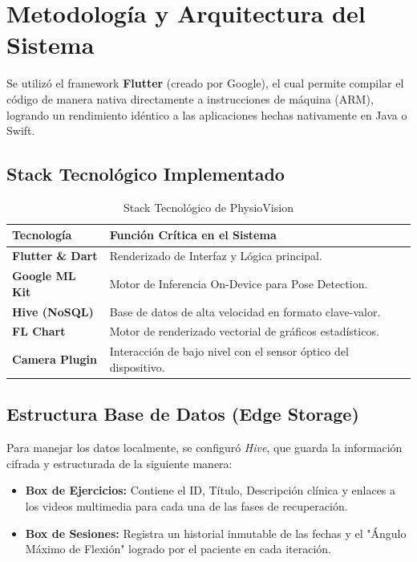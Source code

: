 \documentclass[12pt, a4paper]{article}
\begin{document}
\section{Metodología y Arquitectura del Sistema}
Se utilizó el framework \textbf{Flutter} (creado por Google), el cual permite compilar el código de manera nativa directamente a instrucciones de máquina (ARM), logrando un rendimiento idéntico a las aplicaciones hechas nativamente en Java o Swift.

\subsection{Stack Tecnológico Implementado}
\begin{table}[h]
    \centering
    \begin{tabular}{|l|l|}
    \hline
    \textbf{Tecnología} & \textbf{Función Crítica en el Sistema} \\ \hline
    \textbf{Flutter \& Dart} & Renderizado de Interfaz y Lógica principal. \\ \hline
    \textbf{Google ML Kit} & Motor de Inferencia On-Device para Pose Detection. \\ \hline
    \textbf{Hive (NoSQL)} & Base de datos de alta velocidad en formato clave-valor. \\ \hline
    \textbf{FL Chart} & Motor de renderizado vectorial de gráficos estadísticos. \\ \hline
    \textbf{Camera Plugin} & Interacción de bajo nivel con el sensor óptico del dispositivo. \\ \hline
    \end{tabular}
    \caption{Stack Tecnológico de PhysioVision}
\end{table}

\subsection{Estructura Base de Datos (Edge Storage)}
Para manejar los datos localmente, se configuró \textit{Hive}, que guarda la información cifrada y estructurada de la siguiente manera:
\begin{itemize}
    \item \textbf{Box de Ejercicios:} Contiene el ID, Título, Descripción clínica y enlaces a los videos multimedia para cada una de las fases de recuperación.
    \item \textbf{Box de Sesiones:} Registra un historial inmutable de las fechas y el "Ángulo Máximo de Flexión" logrado por el paciente en cada iteración.
\end{itemize}
\end{document}
